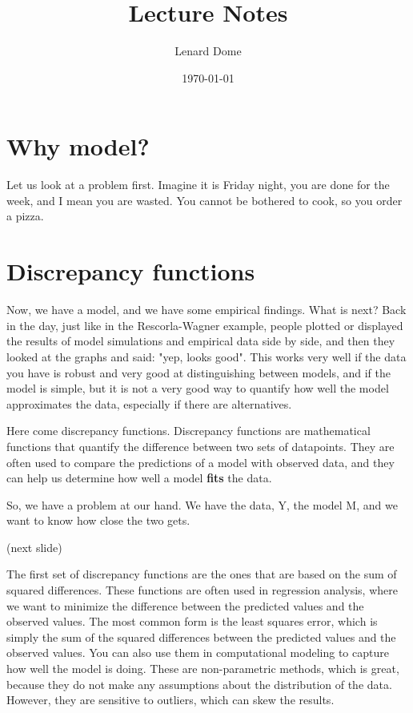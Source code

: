 \documentclass[12pt]{article}
\title{Lecture Notes}
\author{Lenard Dome}
\date{\today}
\begin{document}
\maketitle

\tableofcontents
\newpage

\section{Why model?}

Let us look at a problem first. Imagine it is Friday night, you are done for the week, and I mean you are wasted. You cannot be bothered to cook, so you order a pizza. 


\section{Discrepancy functions}

Now, we have a model, and we have some empirical findings. What is next? Back in the day, just like in the Rescorla-Wagner example, people plotted or displayed the results of model simulations and empirical data side by side, and then they looked at the graphs and said: "yep, looks good". This works very well if the data you have is robust and very good at distinguishing between models, and if the model is simple, but it is not a very good way to quantify how well the model approximates the data, especially if there are alternatives.

Here come discrepancy functions. Discrepancy functions are mathematical functions that quantify the difference between two sets of datapoints. They are often used to compare the predictions of a model with observed data, and they can help us determine how well a model \textbf{fits} the data.

So, we have a problem at our hand. We have the data, Y, the model M, and we want to know how close the two gets.

(next slide)

The first set of discrepancy functions are the ones that are based on the sum of squared differences. These functions are often used in regression analysis, where we want to minimize the difference between the predicted values and the observed values. The most common form is the least squares error, which is simply the sum of the squared differences between the predicted values and the observed values. You can also use them in computational modeling to capture how well the model is doing. These are non-parametric methods, which is great, because they do not make any assumptions about the distribution of the data. However, they are sensitive to outliers, which can skew the results.
\end{document}
